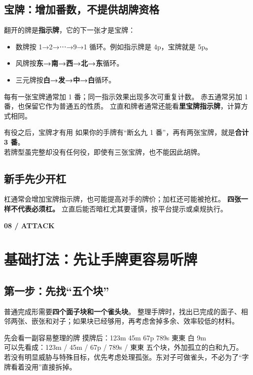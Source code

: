 \documentclass[UTF8,a4paper,zihao=5,fontset=fandol]{ctexart}
\newcommand{\pageintro}[3]{\clearpage\phantomsection\label{#1}
 {\small\sffamily\bfseries\color{gold}#2}\par\vspace{2pt}\section{#3}}
\newcommand{\notation}[1]{{\ttfamily\color{teal}#1}}
\begin{document}
\subsection{宝牌：增加番数，不提供胡牌资格}
翻开的牌是\textbf{指示牌}，它的下一张才是宝牌：
\begin{itemize}
\item 数牌按 1→2→⋯→9→1 循环。例如指示牌是 \notation{4p}，宝牌就是 \notation{5p}。
\item 风牌按\textbf{东→南→西→北→东}循环。
\item 三元牌按\textbf{白→发→中→白}循环。
\end{itemize}
每有一张宝牌通常加 1 番；同一指示效果出现多次可重复计数。
赤五通常另加 1 番，也保留它作为普通五的性质。
立直和牌者通常还能看\textbf{里宝牌指示牌}，计算方式相同。

\begin{example}{有役之后，宝牌才有用}
如果你的手牌有“断幺九 1 番”，再有两张宝牌，就是\textbf{合计 3 番}。\\
若牌型虽完整却没有任何役，即使有三张宝牌，也不能因此胡牌。
\end{example}
\subsection{新手先少开杠}
杠通常会增加宝牌指示牌，也可能提高对手的牌价；加杠还可能被抢杠。
\textbf{四张一样不代表必须杠。} 立直后能否暗杠尤其要谨慎，按平台提示或桌规执行。

\pageintro{efficiency}{08 / ATTACK}{基础打法：先让手牌更容易听牌}
\subsection{第一步：先找“五个块”}
普通完成形需要\textbf{四个面子块和一个雀头块}。
整理手牌时，找出已完成的面子、相邻两张、嵌张和对子；如果块已经够用，再考虑舍掉多余、效率较低的材料。

\begin{example}{先会看一副容易整理的牌}
摸牌后：\notation{123m 45m 67p 789s 東東 白 9m}\\
可以先看成：\notation{123m / 45m / 67p / 789s / 東東} 五个块，外加孤立的白和九万。\\
若没有明显威胁与特殊目标，优先考虑处理孤张。东对子可做雀头，不必为了“字牌看着没用”直接拆掉。
\end{example}
\end{document}

